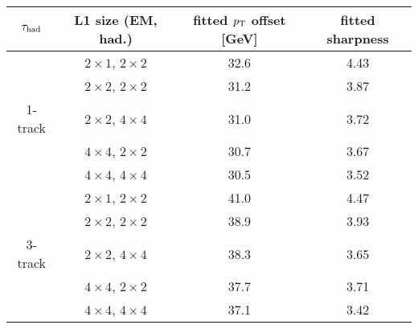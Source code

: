 \begin{tabular}{c|c|c|c}
  $\tau_\text{had}$  & L1 size (EM, had.)                 & fitted $p_{\mathrm{T}}$ offset [GeV] & fitted sharpness \\
  \hline\hline
           & $2 \!\times\! 1$, $2 \!\times\! 2$ & 32.6                      & 4.43             \\
           & $2 \!\times\! 2$, $2 \!\times\! 2$ & 31.2                      & 3.87             \\
  1-track  & $2 \!\times\! 2$, $4 \!\times\! 4$ & 31.0                      & 3.72             \\
           & $4 \!\times\! 4$, $2 \!\times\! 2$ & 30.7                      & 3.67             \\
           & $4 \!\times\! 4$, $4 \!\times\! 4$ & 30.5                      & 3.52             \\
  \hline
           & $2 \!\times\! 1$, $2 \!\times\! 2$ & 41.0                      & 4.47             \\
           & $2 \!\times\! 2$, $2 \!\times\! 2$ & 38.9                      & 3.93             \\
  3-track  & $2 \!\times\! 2$, $4 \!\times\! 4$ & 38.3                      & 3.65             \\
           & $4 \!\times\! 4$, $2 \!\times\! 2$ & 37.7                      & 3.71             \\
           & $4 \!\times\! 4$, $4 \!\times\! 4$ & 37.1                      & 3.42             \\
\end{tabular}
